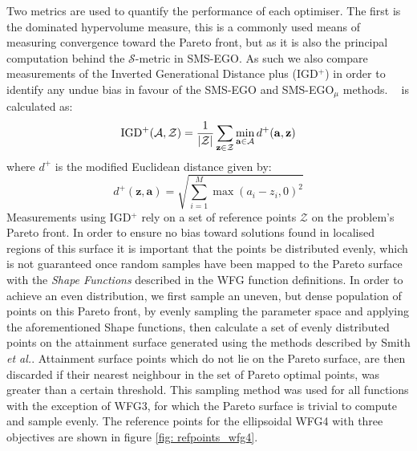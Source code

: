 \documentclass[conference]{IEEEtran}
\makeatletter
\DeclarePairedDelimiter\abs{\lvert}{\rvert}%
\newcommand{\attainmentfront}{\mathcal{A}}
\newcommand{\nobj}{M}
\DeclareMathOperator*{\igdp}{IGD^{+}}
\newcommand\hpv{dominated hypervolume\xspace}
\newcommand\smsego{SMS-EGO\xspace}
\newcommand\smsegomu{SMS-EGO$_{\mu}$\xspace}
\newcommand\igd{IGD$^+$\xspace}
\newcommand{\pigdref}{\mathcal{Z}}
\newcommand*{\etal}{\textit{et al.}\@\xspace}
\makeatother
\begin{document}
Two metrics are used to quantify the performance of each optimiser. The first is the \hpv measure, this is a commonly used means of measuring convergence toward the Pareto front, but as it is also the principal computation behind the $\mathcal{S}$-metric in \smsego. As such we also compare measurements of the Inverted Generational Distance plus (\igd) \cite{ishibuchi2015modified} in order to identify any undue bias in favour of the \smsego and \smsegomu methods. $\igdp$ is calculated as:
\begin{equation}
    \igdp(\attainmentfront, \pigdref) = \frac{1}{\abs{\pigdref}}
    \sum_{\mathbf{z}\in\pigdref} \min_{\mathbf{a}\in \attainmentfront} d^{+}(\mathbf{a}, \mathbf{z})
\end{equation}
where $d^{+}$ is the modified Euclidean distance given by:
\begin{equation}
    d^+(\mathbf{z}, \mathbf{a}) = \sqrt{\sum^{\nobj}_{i=1}\max(a_i - z_i, 0)^2}
\end{equation}
Measurements using \igd rely on a set of reference points $\pigdref$ on the problem's Pareto front. In order to ensure no bias toward solutions found in localised regions of this surface it is important that the points be distributed evenly, which is not guaranteed once random samples have been mapped to the Pareto surface with the \textit{Shape Functions} described in the WFG function definitions. In order to achieve an even distribution, we first sample an uneven, but dense population of points on this Pareto front, by evenly sampling the parameter space and applying the aforementioned Shape functions, then calculate a set of evenly distributed points on the attainment surface generated using the methods described by Smith \etal \cite{smith2004dominance}. Attainment surface points which do not lie on the Pareto surface, are then discarded if their nearest neighbour in the set of Pareto optimal points, was greater than a certain threshold. This sampling method was used for all functions with the exception of WFG3, for which the Pareto surface is trivial to compute and sample evenly. The reference points for the ellipsoidal WFG4 with three objectives are shown in figure \ref{fig: refpoints_wfg4}.  
\end{document}
